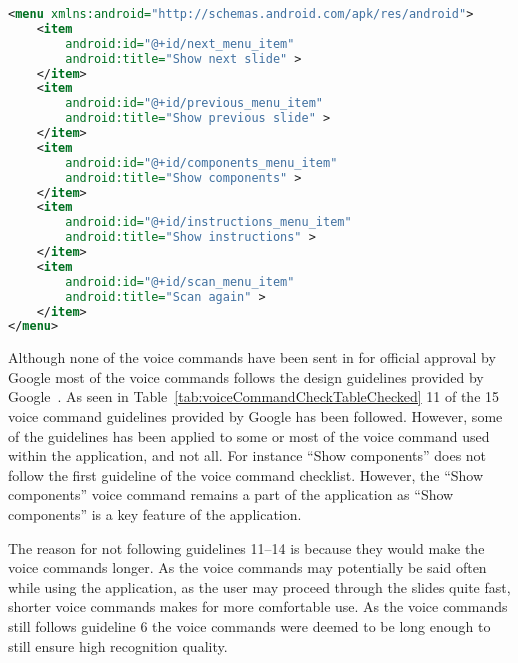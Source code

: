 \begin{lstlisting}[language=XML, caption={The voice command menu XML file}, label=voiceCommandXML]
<menu xmlns:android="http://schemas.android.com/apk/res/android">
	<item
		android:id="@+id/next_menu_item"
		android:title="Show next slide" >
	</item>
	<item
		android:id="@+id/previous_menu_item"
		android:title="Show previous slide" >
	</item>
	<item
		android:id="@+id/components_menu_item"
		android:title="Show components" >
	</item>
	<item
		android:id="@+id/instructions_menu_item"
		android:title="Show instructions" >
	</item>
	<item
		android:id="@+id/scan_menu_item"
		android:title="Scan again" >
	</item>
</menu>
\end{lstlisting}

Although none of the voice commands have been sent in for official approval by Google most of the voice commands follows the design guidelines provided by Google~\cite{glassVoiceChecklist}. As seen in Table~\ref{tab:voiceCommandCheckTableChecked} 11 of the 15 voice command guidelines provided by Google has been followed. However, some of the guidelines has been applied to some or most of the voice command used within the application, and not all. For instance ``Show components'' does not follow the first guideline of the voice command checklist. However, the ``Show components'' voice command remains a part of the application as ``Show components'' is a key feature of the application.



The reason for not following guidelines 11--14 is because they would make the voice commands longer. As the voice commands may potentially be said often while using the application, as the user may proceed through the slides quite fast, shorter voice commands makes for more comfortable use. As the voice commands still follows guideline 6 the voice commands were deemed to be long enough to still ensure high recognition quality.